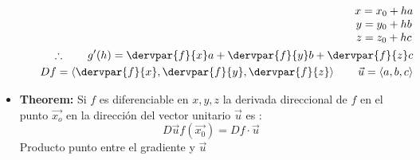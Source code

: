 \begin{itemize}
\begin{itemize}
\begin{center}
\begin{align*}
\begin{matrix}
                           x = x_0+ha \\ 
                           y = y_0+hb \\ 
                           z = z_0+hc \\ 
                       \end{matrix}  \\ 
                       \therefore \qquad g'(h) = \dervpar{f}{x} a + \dervpar{f}{y} b + \dervpar{f}{z} c \\ 
                       Df = \left\langle \dervpar{f}{x} , \dervpar{f}{y} , \dervpar{f}{z}  \right\rangle \qquad \vec{u} = \left\langle a,b,c \right\rangle \\ 
                   \end{align*}
                \end{center}
        \end{itemize}
    
    \item \textbf{Theorem: } Si $f$ es diferenciable en $x,y,z$ la derivada direccional de $f$ en el punto $\vec{x_o}$ en la dirección del vector unitario $\vec{u}$ es :
        \[
          D\vec{u} f(\vec{x_0}) = Df \cdot \vec{u} 
        \]
        Producto punto entre el gradiente y $\vec{u}$
\end{itemize}


